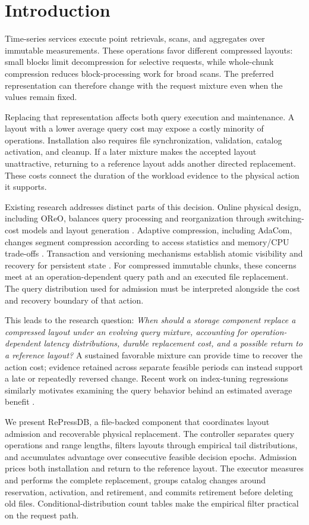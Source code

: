 \section{Introduction}
Time-series services execute point retrievals, scans, and aggregates over immutable measurements. These operations favor different compressed layouts: small blocks limit decompression for selective requests, while whole-chunk compression reduces block-processing work for broad scans. The preferred representation can therefore change with the request mixture even when the values remain fixed.

Replacing that representation affects both query execution and maintenance. A layout with a lower average query cost may expose a costly minority of operations. Installation also requires file synchronization, validation, catalog activation, and cleanup. If a later mixture makes the accepted layout unattractive, returning to a reference layout adds another directed replacement. These costs connect the duration of the workload evidence to the physical action it supports.

Existing research addresses distinct parts of this decision. Online physical design, including OReO, balances query processing and reorganization through switching-cost models and layout generation \citep{rong2024oreo}. Adaptive compression, including AdaCom, changes segment compression according to access statistics and memory/CPU trade-offs \citep{windheuser2024adacom}. Transaction and versioning mechanisms establish atomic visibility and recovery for persistent state \citep{mohan1992aries,gray1992transaction,sqlitewal}. For compressed immutable chunks, these concerns meet at an operation-dependent query path and an executed file replacement. The query distribution used for admission must be interpreted alongside the cost and recovery boundary of that action.

This leads to the research question: \emph{When should a storage component replace a compressed layout under an evolving query mixture, accounting for operation-dependent latency distributions, durable replacement cost, and a possible return to a reference layout?} A sustained favorable mixture can provide time to recover the action cost; evidence retained across separate feasible periods can instead support a late or repeatedly reversed change. Recent work on index-tuning regressions similarly motivates examining the query behavior behind an estimated average benefit \citep{wu2025qpr}.

We present RePressDB, a file-backed component that coordinates layout admission and recoverable physical replacement. The controller separates query operations and range lengths, filters layouts through empirical tail distributions, and accumulates advantage over consecutive feasible decision epochs. Admission prices both installation and return to the reference layout. The executor measures and performs the complete replacement, groups catalog changes around reservation, activation, and retirement, and commits retirement before deleting old files. Conditional-distribution count tables make the empirical filter practical on the request path.

